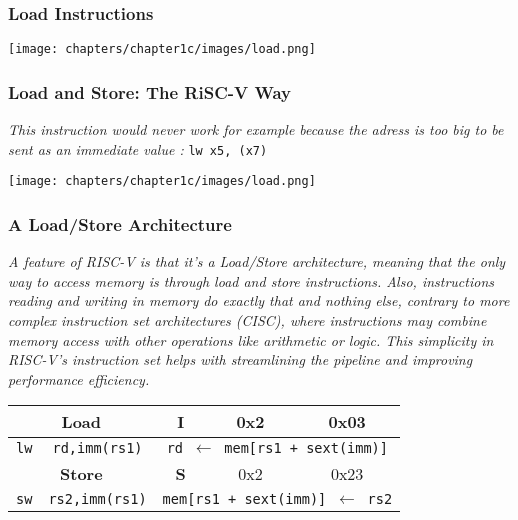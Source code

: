 \subsubsection{Load Instructions}
\begin{center}
    \texttt{[image: chapters/chapter1c/images/load.png]}
\end{center}
\subsubsection{Load and Store: The RiSC-V Way}
\textit{This instruction would never work for example because the adress is too big to be sent as an immediate value :} \texttt{lw x5, (x7)} \\ \vspace*{5px}
\begin{center}
    \texttt{[image: chapters/chapter1c/images/load.png]}
\end{center}
\subsubsection{A Load/Store Architecture}
\textit{A feature of RISC-V is that it's a Load/Store architecture, meaning that the only way to access memory is through load and store instructions. Also, instructions reading and writing in memory do exactly that and nothing else, contrary to more complex instruction set architectures (CISC), where instructions may combine memory access with other operations like arithmetic or logic. This simplicity in RISC-V's instruction set helps with streamlining the pipeline and improving performance efficiency.} \\ \vspace*{5px}

\begin{center}
    \begin{tabular}{|c|c|c|c|c|}
        \hline
        \multicolumn{2}{|c|}{\textbf{Load}} & \textbf{I} & 0x2 & 0x03 \\
        \hline
        \texttt{lw} & \texttt{rd,imm(rs1)} & \multicolumn{3}{c|}{\texttt{rd $\leftarrow$ mem[rs1 + sext(imm)]}} \\
        \hline
        \multicolumn{2}{|c|}{\textbf{Store}} & \textbf{S} & 0x2 & 0x23 \\
        \hline
        \texttt{sw} & \texttt{rs2,imm(rs1)} & \multicolumn{3}{c|}{\texttt{mem[rs1 + sext(imm)] $\leftarrow$ rs2}} \\
        \hline
    \end{tabular}
\end{center}

